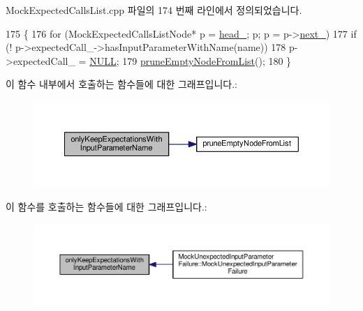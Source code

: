 Mock\+Expected\+Calls\+List.\+cpp 파일의 174 번째 라인에서 정의되었습니다.


\begin{DoxyCode}
175 \{
176     \textcolor{keywordflow}{for} (MockExpectedCallsListNode* p = \hyperlink{class_mock_expected_calls_list_a18290c3c0a206882dd8e0d9f446e2fe6}{head\_}; p; p = p->\hyperlink{class_mock_expected_calls_list_1_1_mock_expected_calls_list_node_aaae452a372ae14c06a6d5d252df73725}{next\_})
177         \textcolor{keywordflow}{if} (! p->expectedCall\_->hasInputParameterWithName(name))
178             p->expectedCall\_ = \hyperlink{openavb__types__base__pub_8h_a070d2ce7b6bb7e5c05602aa8c308d0c4}{NULL};
179     \hyperlink{class_mock_expected_calls_list_aeb4c1dd9901800365e942770b132c94b}{pruneEmptyNodeFromList}();
180 \}
\end{DoxyCode}


이 함수 내부에서 호출하는 함수들에 대한 그래프입니다.\+:
\nopagebreak
\begin{figure}[H]
\begin{center}
\leavevmode
\includegraphics[width=350pt]{class_mock_expected_calls_list_a1f78cc6c0afaaab2bc11c4de935d73b5_cgraph}
\end{center}
\end{figure}




이 함수를 호출하는 함수들에 대한 그래프입니다.\+:
\nopagebreak
\begin{figure}[H]
\begin{center}
\leavevmode
\includegraphics[width=350pt]{class_mock_expected_calls_list_a1f78cc6c0afaaab2bc11c4de935d73b5_icgraph}
\end{center}
\end{figure}


